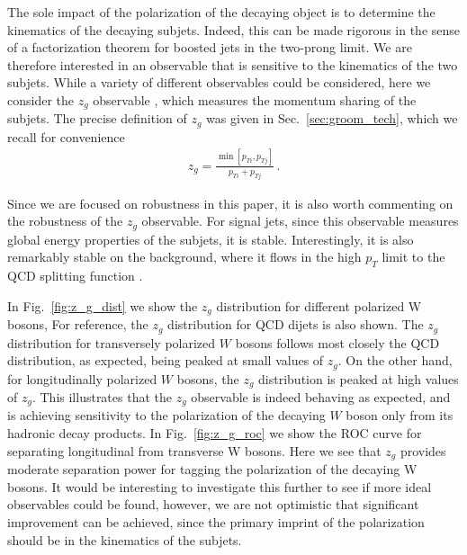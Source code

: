 \documentclass[11pt,letterpaper]{article}
\DeclareRobustCommand{\Sec}[1]{Sec.~\ref{#1}}
\DeclareRobustCommand{\Fig}[1]{Fig.~\ref{#1}}
\begin{document}
The sole impact of the polarization of the decaying object is to determine the kinematics of the decaying subjets.
%
Indeed, this can be made rigorous in the sense of a factorization theorem for boosted jets in the two-prong limit.
%
We are therefore interested in an observable that is sensitive to the kinematics of the two subjets.
%
While a variety of different observables could be considered, here we consider the $z_g$ observable \cite{Larkoski:2014wba,Larkoski:2014bia,Larkoski:2015lea}, which measures the momentum sharing of the subjets. The precise definition of $z_g$ was given in \Sec{sec:groom_tech}, which we recall for convenience
\begin{align}
z_g=\frac{\min\left[ p_{Ti}, p_{Tj}  \right]}{p_{Ti}+p_{Tj}}\,.
\end{align}

Since we are focused on robustness in this paper, it is also worth commenting on the robustness of the $z_g$ observable. For signal jets, since this observable measures global energy properties of the subjets, it is stable.
%
Interestingly, it is also remarkably stable on the background, where it flows in the high $p_T$ limit to the QCD splitting function \cite{Larkoski:2014wba,Larkoski:2014bia,Larkoski:2015lea}.


In \Fig{fig:z_g_dist} we show the $z_g$ distribution for different polarized W bosons, For reference, the $z_g$ distribution for QCD dijets is also shown. The $z_g$ distribution for transversely polarized $W$ bosons follows most closely the QCD distribution, as expected, being peaked at small values of $z_g$. On the other hand, for longitudinally polarized $W$ bosons, the $z_g$ distribution is peaked at high values of $z_g$. This illustrates that the $z_g$ observable is indeed behaving as expected, and is achieving sensitivity to the polarization of the decaying $W$ boson only from its hadronic decay products. In \Fig{fig:z_g_roc} we show  the ROC curve for separating longitudinal from transverse W bosons. Here we see that $z_g$ provides moderate separation power for tagging the polarization of the decaying W bosons. It would be interesting to investigate this further to see if more ideal observables could be found, however, we are not optimistic that significant improvement can be achieved, since the primary imprint of the polarization should be in the kinematics of the subjets.
\end{document}
